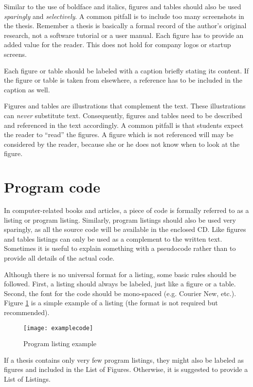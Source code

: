 Similar to the use of boldface and italics, figures and tables should also be used \textit{sparingly} and \textit{selectively}. A common pitfall is to include too many screenshots in the thesis. Remember a thesis is basically a formal record of the author's original research, not a software tutorial or a user manual. Each figure has to provide an added value for the reader. This does not hold for company logos or startup screens.

Each figure or table should be labeled with a caption briefly stating its content. If the figure or table is taken from elsewhere, a reference has to be included in the caption as well.

Figures and tables are illustrations that complement the text. These illustrations can \textit{never} substitute text. Consequently, figures and tables need to be described and referenced in the text accordingly. A common pitfall is that students expect the reader to ``read'' the figures. A figure which is not referenced will may be considered by the reader, because she or he does not know when to look at the figure.

\section{Program code}

In computer-related books and articles, a piece of code is formally referred to as a listing or program listing. Similarly, program listings should also be used very sparingly, as all the source code will be available in the enclosed CD. Like figures and tables listings can only be used as a complement to the written text. Sometimes it is useful to explain something with a pseudocode rather than to provide all details of the actual code. 

Although there is no universal format for a listing, some basic rules should be followed. First, a listing should always be labeled, just like a figure or a table. Second, the font for the code should be mono-spaced (e.g. Courier New, etc.). Figure \ref{fig:examplecode} is a simple example of a listing (the format is not required but recommended).

\begin{figure}[htb]
  \centering
  \texttt{[image: examplecode]}
  \caption{Program listing example}\label{fig:examplecode}
\end{figure}

If a thesis contains only very few program listings, they might also be labeled as figures and included in the List of Figures. Otherwise, it is suggested to provide a List of Listings.

